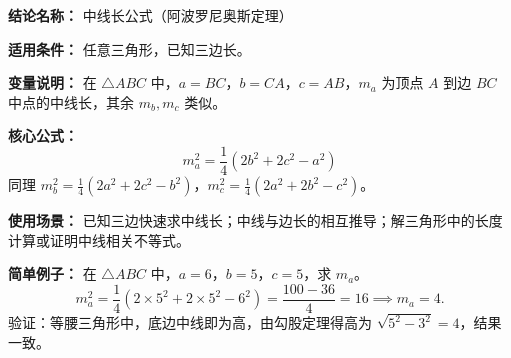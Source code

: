 \textbf{结论名称：} 中线长公式（阿波罗尼奥斯定理）

\textbf{适用条件：} 任意三角形，已知三边长。

\textbf{变量说明：} 在 $\triangle ABC$ 中，$a=BC$，$b=CA$，$c=AB$，$m_a$ 为顶点 $A$ 到边 $BC$ 中点的中线长，其余 $m_b,m_c$ 类似。

\textbf{核心公式：} 
\[ \boxed{m_a^{2} = \frac{1}{4}(2b^{2} + 2c^{2} - a^{2})} \]
同理 $m_b^{2} = \frac{1}{4}(2a^{2} + 2c^{2} - b^{2})$，$m_c^{2} = \frac{1}{4}(2a^{2} + 2b^{2} - c^{2})$。

\textbf{使用场景：} 已知三边快速求中线长；中线与边长的相互推导；解三角形中的长度计算或证明中线相关不等式。

\textbf{简单例子：} 在 $\triangle ABC$ 中，$a=6$，$b=5$，$c=5$，求 $m_a$。
\[ m_a^{2} = \frac{1}{4}(2\times 5^{2} + 2\times 5^{2} - 6^{2}) = \frac{100-36}{4} = 16 \implies m_a = 4. \]
验证：等腰三角形中，底边中线即为高，由勾股定理得高为 $\sqrt{5^{2}-3^{2}}=4$，结果一致。